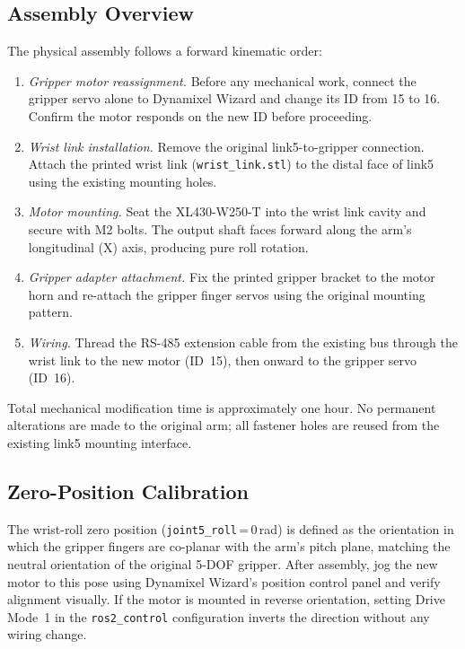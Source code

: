 \documentclass[conference]{IEEEtran}
\begin{document}
	\subsection{Assembly Overview}
	
	The physical assembly follows a forward kinematic order:
	
	\begin{enumerate}
		\item \textit{Gripper motor reassignment.}
		Before any mechanical work, connect the gripper servo alone to
		Dynamixel Wizard and change its ID from 15 to 16. Confirm the
		motor responds on the new ID before proceeding.
		
		\item \textit{Wrist link installation.}
		Remove the original link5-to-gripper connection. Attach the
		printed wrist link (\texttt{wrist\_link.stl}) to the distal
		face of link5 using the existing mounting holes.
		
		\item \textit{Motor mounting.}
		Seat the XL430-W250-T into the wrist link cavity and secure
		with M2 bolts. The output shaft faces forward along the arm's
		longitudinal (X) axis, producing pure roll rotation.
		
		\item \textit{Gripper adapter attachment.}
		Fix the printed gripper bracket to the motor horn and re-attach
		the gripper finger servos using the original mounting pattern.
		
		\item \textit{Wiring.}
		Thread the RS-485 extension cable from the existing bus through
		the wrist link to the new motor (ID~15), then onward to the
		gripper servo (ID~16).
	\end{enumerate}
	
	Total mechanical modification time is approximately one hour. No
	permanent alterations are made to the original arm; all fastener holes
	are reused from the existing link5 mounting interface.
	
	\subsection{Zero-Position Calibration}
	
	The wrist-roll zero position (\texttt{joint5\_roll}\,=\,0\,rad) is
	defined as the orientation in which the gripper fingers are co-planar
	with the arm's pitch plane, matching the neutral orientation of the
	original 5-DOF gripper. After assembly, jog the new motor to this pose
	using Dynamixel Wizard's position control panel and verify alignment
	visually. If the motor is mounted in reverse orientation, setting Drive
	Mode~1 in the \texttt{ros2\_control} configuration inverts the
	direction without any wiring change.
	
\end{document}
